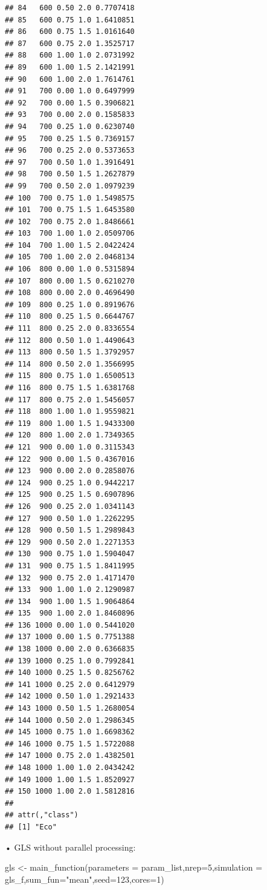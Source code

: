 \documentclass[11pt,a4paper]{article}
\newenvironment{Shaded}{\begin{snugshade}}{\end{snugshade}}
\newcommand{\AttributeTok}[1]{\textcolor[rgb]{0.77,0.63,0.00}{#1}}
\newcommand{\DecValTok}[1]{\textcolor[rgb]{0.00,0.00,0.81}{#1}}
\newcommand{\FunctionTok}[1]{\textcolor[rgb]{0.00,0.00,0.00}{#1}}
\newcommand{\NormalTok}[1]{#1}
\newcommand{\OtherTok}[1]{\textcolor[rgb]{0.56,0.35,0.01}{#1}}
\newcommand{\StringTok}[1]{\textcolor[rgb]{0.31,0.60,0.02}{#1}}
\begin{document}
\begin{verbatim}
## 84   600 0.50 2.0 0.7707418
## 85   600 0.75 1.0 1.6410851
## 86   600 0.75 1.5 1.0161640
## 87   600 0.75 2.0 1.3525717
## 88   600 1.00 1.0 2.0731992
## 89   600 1.00 1.5 2.1421991
## 90   600 1.00 2.0 1.7614761
## 91   700 0.00 1.0 0.6497999
## 92   700 0.00 1.5 0.3906821
## 93   700 0.00 2.0 0.1585833
## 94   700 0.25 1.0 0.6230740
## 95   700 0.25 1.5 0.7369157
## 96   700 0.25 2.0 0.5373653
## 97   700 0.50 1.0 1.3916491
## 98   700 0.50 1.5 1.2627879
## 99   700 0.50 2.0 1.0979239
## 100  700 0.75 1.0 1.5498575
## 101  700 0.75 1.5 1.6453580
## 102  700 0.75 2.0 1.8486661
## 103  700 1.00 1.0 2.0509706
## 104  700 1.00 1.5 2.0422424
## 105  700 1.00 2.0 2.0468134
## 106  800 0.00 1.0 0.5315894
## 107  800 0.00 1.5 0.6210270
## 108  800 0.00 2.0 0.4696490
## 109  800 0.25 1.0 0.8919676
## 110  800 0.25 1.5 0.6644767
## 111  800 0.25 2.0 0.8336554
## 112  800 0.50 1.0 1.4490643
## 113  800 0.50 1.5 1.3792957
## 114  800 0.50 2.0 1.3566995
## 115  800 0.75 1.0 1.6500513
## 116  800 0.75 1.5 1.6381768
## 117  800 0.75 2.0 1.5456057
## 118  800 1.00 1.0 1.9559821
## 119  800 1.00 1.5 1.9433300
## 120  800 1.00 2.0 1.7349365
## 121  900 0.00 1.0 0.3115343
## 122  900 0.00 1.5 0.4367016
## 123  900 0.00 2.0 0.2858076
## 124  900 0.25 1.0 0.9442217
## 125  900 0.25 1.5 0.6907896
## 126  900 0.25 2.0 1.0341143
## 127  900 0.50 1.0 1.2262295
## 128  900 0.50 1.5 1.2989843
## 129  900 0.50 2.0 1.2271353
## 130  900 0.75 1.0 1.5904047
## 131  900 0.75 1.5 1.8411995
## 132  900 0.75 2.0 1.4171470
## 133  900 1.00 1.0 2.1290987
## 134  900 1.00 1.5 1.9064864
## 135  900 1.00 2.0 1.8460896
## 136 1000 0.00 1.0 0.5441020
## 137 1000 0.00 1.5 0.7751388
## 138 1000 0.00 2.0 0.6366835
## 139 1000 0.25 1.0 0.7992841
## 140 1000 0.25 1.5 0.8256762
## 141 1000 0.25 2.0 0.6412979
## 142 1000 0.50 1.0 1.2921433
## 143 1000 0.50 1.5 1.2680054
## 144 1000 0.50 2.0 1.2986345
## 145 1000 0.75 1.0 1.6698362
## 146 1000 0.75 1.5 1.5722088
## 147 1000 0.75 2.0 1.4382501
## 148 1000 1.00 1.0 2.0434242
## 149 1000 1.00 1.5 1.8520927
## 150 1000 1.00 2.0 1.5812816
## 
## attr(,"class")
## [1] "Eco"
\end{verbatim}

• GLS without parallel processing:

\begin{Shaded}
\begin{Highlighting}[]
\NormalTok{gls }\OtherTok{\textless{}{-}} \FunctionTok{main\_function}\NormalTok{(}\AttributeTok{parameters =}\NormalTok{ param\_list,}\AttributeTok{nrep=}\DecValTok{5}\NormalTok{,}\AttributeTok{simulation =}\NormalTok{ gls\_f,}\AttributeTok{sum\_fun=}\StringTok{"mean"}\NormalTok{,}\AttributeTok{seed=}\DecValTok{123}\NormalTok{,}\AttributeTok{cores=}\DecValTok{1}\NormalTok{)}
\end{Highlighting}
\end{Shaded}
\end{document}
